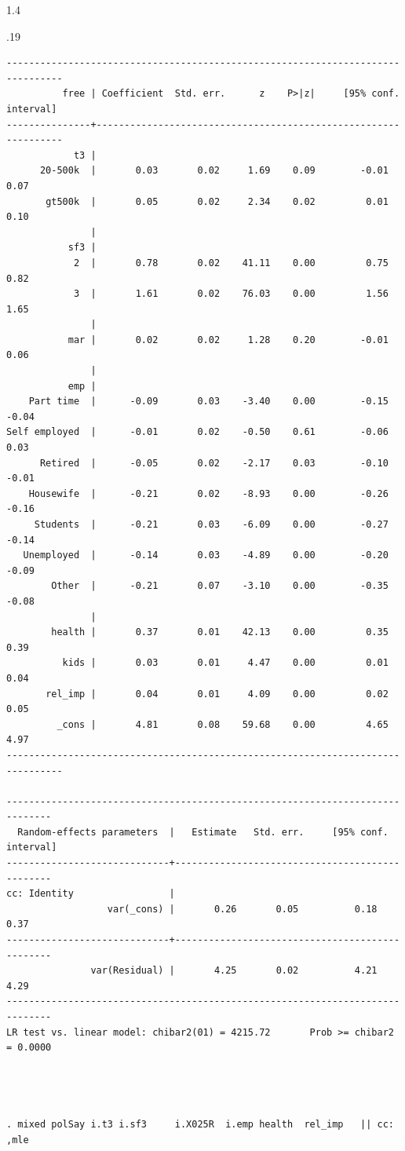 \documentclass[10pt, letterpaper]{article}
\begin{document}
\begin{spacing}{1.4}
\begin{scriptsize}
\begin{spacing}{.19}
\begin{verbatim}
--------------------------------------------------------------------------------
          free | Coefficient  Std. err.      z    P>|z|     [95% conf. interval]
---------------+----------------------------------------------------------------
            t3 |
      20-500k  |       0.03       0.02     1.69    0.09        -0.01        0.07
       gt500k  |       0.05       0.02     2.34    0.02         0.01        0.10
               |
           sf3 |
            2  |       0.78       0.02    41.11    0.00         0.75        0.82
            3  |       1.61       0.02    76.03    0.00         1.56        1.65
               |
           mar |       0.02       0.02     1.28    0.20        -0.01        0.06
               |
           emp |
    Part time  |      -0.09       0.03    -3.40    0.00        -0.15       -0.04
Self employed  |      -0.01       0.02    -0.50    0.61        -0.06        0.03
      Retired  |      -0.05       0.02    -2.17    0.03        -0.10       -0.01
    Housewife  |      -0.21       0.02    -8.93    0.00        -0.26       -0.16
     Students  |      -0.21       0.03    -6.09    0.00        -0.27       -0.14
   Unemployed  |      -0.14       0.03    -4.89    0.00        -0.20       -0.09
        Other  |      -0.21       0.07    -3.10    0.00        -0.35       -0.08
               |
        health |       0.37       0.01    42.13    0.00         0.35        0.39
          kids |       0.03       0.01     4.47    0.00         0.01        0.04
       rel_imp |       0.04       0.01     4.09    0.00         0.02        0.05
         _cons |       4.81       0.08    59.68    0.00         4.65        4.97
--------------------------------------------------------------------------------

------------------------------------------------------------------------------
  Random-effects parameters  |   Estimate   Std. err.     [95% conf. interval]
-----------------------------+------------------------------------------------
cc: Identity                 |
                  var(_cons) |       0.26       0.05          0.18        0.37
-----------------------------+------------------------------------------------
               var(Residual) |       4.25       0.02          4.21        4.29
------------------------------------------------------------------------------
LR test vs. linear model: chibar2(01) = 4215.72       Prob >= chibar2 = 0.0000




. mixed polSay i.t3 i.sf3     i.X025R  i.emp health  rel_imp   || cc:   ,mle


\end{verbatim}
\end{spacing}
\end{scriptsize}
\end{spacing}
\end{document}
